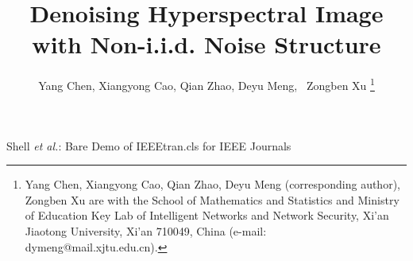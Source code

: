 \documentclass[journal]{IEEEtran}
\begin{document}
\title{Denoising Hyperspectral Image with Non-i.i.d. Noise Structure}



\author{Yang Chen, Xiangyong Cao, Qian Zhao, Deyu Meng,~ Zongben Xu
\thanks{Yang Chen, Xiangyong Cao, Qian Zhao, Deyu Meng (corresponding author), Zongben Xu are with the School of Mathematics and Statistics and Ministry
	of Education Key Lab of Intelligent Networks and Network
	Security, Xi'an Jiaotong University, Xi'an 710049, China (e-mail: dymeng@mail.xjtu.edu.cn).}}


%
%


%
{Shell \MakeLowercase{\textit{et al.}}: Bare Demo of IEEEtran.cls for IEEE Journals}
%
\end{document}
